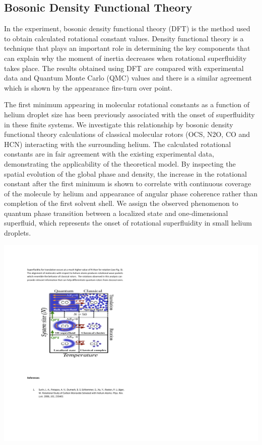 \documentclass[a0b,landscape]{a0poster}
\begin{document}
\begin{multicols}{3}
\color{Black}

\section*{Bosonic Density Functional Theory}
In the experiment, bosonic density functional theory (DFT) is the method used to obtain calculated rotational constant values.  Density functional theory is a technique that plays an important role in determining the key components that can explain why the moment of inertia decreases when rotational superfluidity takes place. The results obtained using DFT are compared with experimental data and Quantum Monte Carlo (QMC) values and there is a similar agreement which is shown by the appearance firs-turn over point.  

The first minimum appearing in molecular rotational constants as a function of helium droplet size has been previously associated with the onset of superfluidity in these finite systems. We investigate this relationship by bosonic density functional theory calculations of classical molecular rotors (OCS, N2O, CO and HCN) interacting with the surrounding helium. The calculated rotational constants are in fair agreement with the existing experimental data, demonstrating the applicability of the theoretical model. By inspecting the spatial evolution of the global phase and density, the increase in the rotational constant after the first minimum is shown to correlate with continuous coverage of the molecule by helium and appearance of angular phase coherence rather than completion of the first solvent shell. We assign the observed phenomenon to quantum phase transition between a localized state and one-dimensional superfluid, which represents the onset of rotational superfluidity in small helium droplets.

\begin{center}\vspace{1cm}
\includegraphics[width=0.8\linewidth]{SysnVTemp}
\end{center}\vspace{1cm}



\end{multicols}
\end{document}
